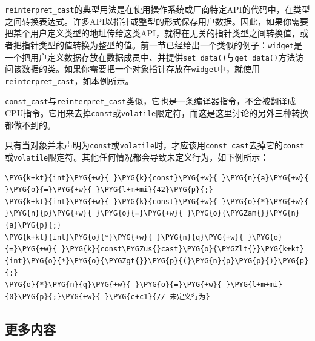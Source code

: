 \texttt{reinterpret\_\allowbreak{}cast}的典型用法是在使用操作系统或厂商特定API的代码中，在类型之间转换表达式。许多API以指针或整型的形式保存用户数据。因此，如果你需要把某个用户定义类型的地址传给这类API，就得在无关的指针类型之间转换值，或者把指针类型的值转换为整型的值。前一节已经给出一个类似的例子：\texttt{widget}是一个把用户定义数据存放在数据成员中、并提供\texttt{set\_\allowbreak{}data()}与\texttt{get\_\allowbreak{}data()}方法访问该数据的类。如果你需要把一个对象指针存放在\texttt{widget}中，就使用\texttt{reinterpret\_\allowbreak{}cast}，如本例所示。



\texttt{const\_\allowbreak{}cast}与\texttt{reinterpret\_\allowbreak{}cast}类似，它也是一条编译器指令，不会被翻译成CPU指令。它用来去掉\texttt{const}或\texttt{volatile}限定符，而这是这里讨论的另外三种转换都做不到的。



\begin{myNote}[tip]
只有当对象并未声明为\texttt{const}或\texttt{volatile}时，才应该用\texttt{const\_\allowbreak{}cast}去掉它的\texttt{const}或\texttt{volatile}限定符。其他任何情况都会导致未定义行为，如下例所示：
\end{myNote}



\begin{codeblockbg}
\begin{Verbatim}[commandchars=\\\{\},breaklines=true,breakanywhere=true,fontsize=\codefont,xleftmargin=17bp]
\PYG{k+kt}{int}\PYG{+w}{ }\PYG{k}{const}\PYG{+w}{ }\PYG{n}{a}\PYG{+w}{ }\PYG{o}{=}\PYG{+w}{ }\PYG{l+m+mi}{42}\PYG{p}{;}
\PYG{k+kt}{int}\PYG{+w}{ }\PYG{k}{const}\PYG{+w}{ }\PYG{o}{*}\PYG{+w}{ }\PYG{n}{p}\PYG{+w}{ }\PYG{o}{=}\PYG{+w}{ }\PYG{o}{\PYGZam{}}\PYG{n}{a}\PYG{p}{;}
\PYG{k+kt}{int}\PYG{o}{*}\PYG{+w}{ }\PYG{n}{q}\PYG{+w}{ }\PYG{o}{=}\PYG{+w}{ }\PYG{k}{const\PYGZus{}cast}\PYG{o}{\PYGZlt{}}\PYG{k+kt}{int}\PYG{o}{*}\PYG{o}{\PYGZgt{}}\PYG{p}{(}\PYG{n}{p}\PYG{p}{)}\PYG{p}{;}
\PYG{o}{*}\PYG{n}{q}\PYG{+w}{ }\PYG{o}{=}\PYG{+w}{ }\PYG{l+m+mi}{0}\PYG{p}{;}\PYG{+w}{ }\PYG{c+c1}{// 未定义行为}
\end{Verbatim}
\end{codeblockbg}



\subsection{更多内容}


